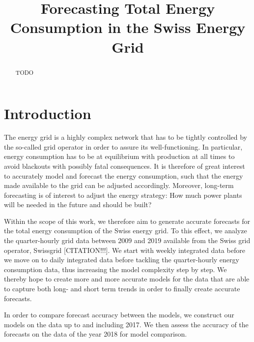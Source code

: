\documentclass[conference]{IEEEtran}
\begin{document}
\title{Forecasting Total Energy Consumption in the Swiss Energy Grid}

\author{
\and
{}
}


\maketitle

\begin{abstract}
TODO
\end{abstract}


\section{Introduction}
The energy grid is a highly complex network that has to be tightly controlled by the so-called grid operator in order to assure its well-functioning. In particular, energy consumption has to be at equilibrium with production at all times to avoid blackouts with possibly fatal consequences. It is therefore of great interest to accurately model and forecast the energy consumption, such that the energy made available to the grid can be adjusted accordingly. Moreover, long-term forecasting is of interest to adjust the energy strategy: How much power plants will be needed in the future and should be built? 
\par
Within the scope of this work, we therefore aim to generate accurate forecasts for the total energy consumption of the Swiss energy grid. To this effect, we analyze the quarter-hourly grid data between 2009 and 2019 available from the Swiss grid operator, Swissgrid [CITATION!!!]. We start with weekly integrated data before we move on to daily integrated data before tackling the quarter-hourly energy consumption data, thus increasing the model complexity step by step. We thereby hope to create more and more accurate models for the data that are able to capture both long- and short term trends in order to finally create accurate forecasts.
\par
In order to compare forecast accuracy between the models, we construct our models on the data up to and including 2017. We then assess the accuracy of the forecasts on the data of the year 2018 for model comparison. 
\par


\end{document}
